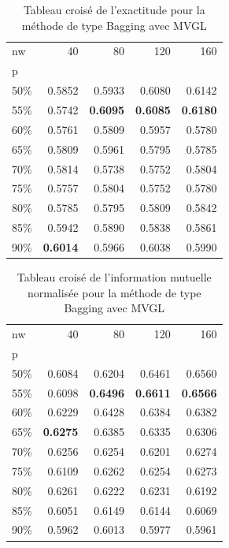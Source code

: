 	\begin{table}[h!]
  		 \caption{Tableau croisé de l'exactitude pour la méthode de type Bagging avec MVGL}
  		 \centering
  		 \begin{tabular}{lrrrr}
    	\toprule
    	nw & 40 & 80 & 120 & 160 \\
    	p &  &  &  &  \\
    	\midrule
    	50\% & 0.5852 & 0.5933 & 0.6080 & 0.6142 \\
    	55\% & 0.5742 & \textbf{0.6095} & \textbf{0.6085} & \textbf{0.6180} \\
    	60\% & 0.5761 & 0.5809 & 0.5957 & 0.5780 \\
    	65\% & 0.5809 & 0.5961 & 0.5795 & 0.5785 \\
    	70\% & 0.5814 & 0.5738 & 0.5752 & 0.5804 \\
    	75\% & 0.5757 & 0.5804 & 0.5752 & 0.5780 \\
    	80\% & 0.5785 & 0.5795 & 0.5809 & 0.5842 \\
    	85\% & 0.5942 & 0.5890 & 0.5838 & 0.5861 \\
    	90\% & \textbf{0.6014} & 0.5966 & 0.6038 & 0.5990 \\
    	\bottomrule
    	\end{tabular}
  		 \label{table:acc_mvgl}
	\end{table}

	\begin{table}[h!]
  		 \caption{Tableau croisé de l'information mutuelle normalisée pour la méthode de type Bagging avec MVGL}
  		 \centering
    	\begin{tabular}{lrrrr}
    	\toprule
    	nw & 40 & 80 & 120 & 160 \\
    	p &  &  &  &  \\
    	\midrule
    	50\% & 0.6084 & 0.6204 & 0.6461 & 0.6560 \\
    	55\% & 0.6098 & \textbf{0.6496} & \textbf{0.6611} & \textbf{0.6566} \\
    	60\% & 0.6229 & 0.6428 & 0.6384 & 0.6382 \\
    	65\% & \textbf{0.6275} & 0.6385 & 0.6335 & 0.6306 \\
    	70\% & 0.6256 & 0.6254 & 0.6201 & 0.6274 \\
    	75\% & 0.6109 & 0.6262 & 0.6254 & 0.6273 \\
    	80\% & 0.6261 & 0.6222 & 0.6231 & 0.6192 \\
    	85\% & 0.6051 & 0.6149 & 0.6144 & 0.6069 \\
    	90\% & 0.5962 & 0.6013 & 0.5977 & 0.5961 \\
    	\bottomrule
    	\end{tabular}
  		 \label{table:nmi_mvgl}
	\end{table}

